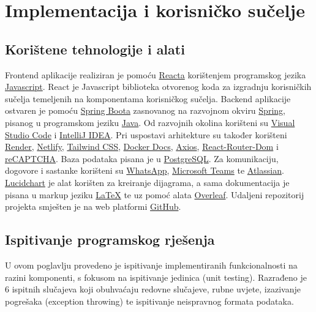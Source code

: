 \chapter{Implementacija i korisničko sučelje}


\section{Korištene tehnologije i alati}

Frontend aplikacije realiziran je pomoću \href{https://reactjs.org}{Reacta} korištenjem programskog jezika \href{https://www.javascript.com/}{Javascript}.  React je Javascript biblioteka otvorenog koda za izgradnju korisničkih sučelja temeljenih na komponentama korisničkog sučelja. Backend aplikacije ostvaren je pomoću \href{https://spring.io/projects/spring-boot/}{Spring Boota} zasnovanog na razvojnom okviru \href{https://spring.io}{Spring}, pisanog u programskom jeziku \href{https://www.java.com/en/}{Java}. Od razvojnih okolina korišteni su \href{https://code.visualstudio.com/}{Visual Studio Code} i \href{https://www.jetbrains.com/idea/}{IntelliJ IDEA}. Pri uspostavi arhitekture su također korišteni \href{https://render.com/}{Render}, \href{https://www.netlify.com/}{Netlify}, \href{https://tailwindcss.com/}{Tailwind CSS}, \href{https://docs.docker.com}{Docker Docs}, \href{https://axios-http.com/}{Axios}, \href{https://reactrouter.com/en/main}{React-Router-Dom} i \href{https://www.google.com/recaptcha/}{reCAPTCHA}. Baza podataka pisana je u \href{https://www.postgresql.org/}{PostgreSQL}. Za komunikaciju, dogovore i sastanke korišteni su \href{https://web.whatsapp.com/}{WhatsApp}, \href{https://www.microsoft.com/en-us/microsoft-teams/log-in}{Microsoft Teams} te \href{https://start.atlassian.com/}{Atlassian}. \href{https://www.lucidchart.com/pages/}{Lucidchart} je alat korišten za kreiranje dijagrama, a sama dokumentacija je pisana u markup jeziku \href{https://www.latex-project.org}{LaTeX} te uz pomoć alata \href{https://www.overleaf.com/}{Overleaf}. Udaljeni repozitorij projekta smješten je na web platformi \href{https://github.com/}{GitHub}.


\eject 


\section{Ispitivanje programskog rješenja}

U ovom poglavlju provedeno je ispitivanje implementiranih funkcionalnosti na razini komponenti, s fokusom na ispitivanje jedinica (unit testing). Razrađeno je 6 ispitnih slučajeva koji obuhvaćaju redovne slučajeve, rubne uvjete, izazivanje pogrešaka (exception throwing) te ispitivanje neispravnog formata podataka.

